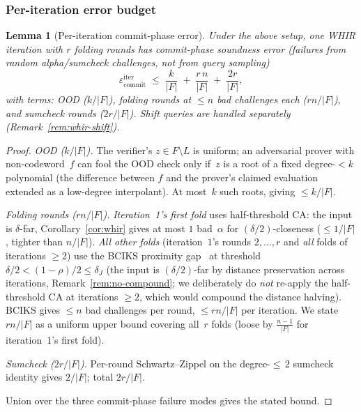 \documentclass[11pt]{article}
\newtheorem{lemma}[theorem]{Lemma}
\begin{document}
\subsubsection*{Per-iteration error budget}

\begin{lemma}[Per-iteration commit-phase error]
\label{lem:whir-iter}
Under the above setup, one WHIR iteration with $r$ folding rounds has \emph{commit-phase} soundness error (failures from random alpha/sumcheck challenges, not from query sampling)
$$\varepsilon^{\mathrm{iter}}_{\mathrm{commit}} \;\leq\; \frac{k}{|F|} \;+\; \frac{r\,n}{|F|} \;+\; \frac{2r}{|F|},$$
with terms: OOD ($k/|F|$), folding rounds at $\leq n$ bad challenges each ($rn/|F|$), and sumcheck rounds ($2r/|F|$). Shift queries are handled separately (Remark~\ref{rem:whir-shift}).
\end{lemma}

\begin{proof}
\emph{OOD ($k/|F|$).} The verifier's $z \in F \setminus L$ is uniform; an adversarial prover with non-codeword~$f$ can fool the OOD check only if~$z$ is a root of a fixed degree-${<}k$ polynomial (the difference between $f$ and the prover's claimed evaluation extended as a low-degree interpolant). At most~$k$ such roots, giving $\leq k/|F|$.

\emph{Folding rounds ($rn/|F|$).} \emph{Iteration~1's first fold} uses half-threshold CA: the input is $\delta$-far, Corollary~\ref{cor:whir} gives at most $1$ bad~$\alpha$ for $(\delta/2)$-closeness ($\leq 1/|F|$, tighter than $n/|F|$). \emph{All other folds} (iteration~$1$'s rounds $2,\ldots,r$ and \emph{all} folds of iterations $\geq 2$) use the BCIKS proximity gap~\cite{BCIKS} at threshold $\delta/2 < (1{-}\rho)/2 \leq \delta_J$ (the input is $(\delta/2)$-far by distance preservation across iterations, Remark~\ref{rem:no-compound}; we deliberately do \emph{not} re-apply the half-threshold CA at iterations $\geq 2$, which would compound the distance halving). BCIKS gives $\leq n$ bad challenges per round, $\leq rn/|F|$ per iteration. We state $rn/|F|$ as a uniform upper bound covering all~$r$ folds (loose by $\frac{n-1}{|F|}$ for iteration~1's first fold).

\emph{Sumcheck ($2r/|F|$).} Per-round Schwartz--Zippel on the degree-${\leq}\,2$ sumcheck identity gives $2/|F|$; total $2r/|F|$.

Union over the three commit-phase failure modes gives the stated bound.
\end{proof}
\end{document}
